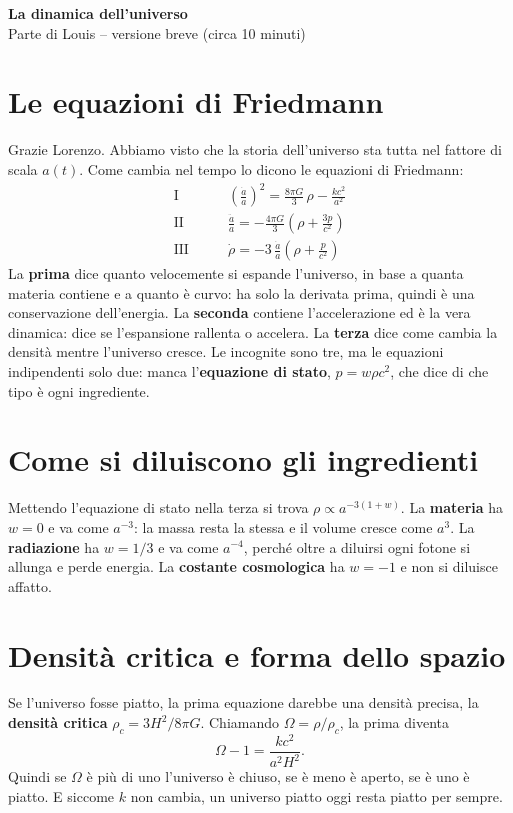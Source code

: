 \documentclass[12pt,a4paper]{article}
\begin{document}
\begin{center}
{\Large\bfseries La dinamica dell'universo}\\[3pt]
{\large Parte di Louis -- versione breve (circa 10 minuti)}
\end{center}

\section{Le equazioni di Friedmann}
Grazie Lorenzo. Abbiamo visto che la storia dell'universo sta tutta nel fattore di scala $a(t)$. Come cambia nel tempo lo dicono le equazioni di Friedmann:
\begin{align*}
\text{I} \qquad & \left(\frac{\dot a}{a}\right)^2 = \frac{8\pi G}{3}\,\rho - \frac{k c^2}{a^2} \\[2pt]
\text{II} \qquad & \frac{\ddot a}{a} = -\frac{4\pi G}{3}\left(\rho + \frac{3p}{c^2}\right) \\[2pt]
\text{III} \qquad & \dot\rho = -3\,\frac{\dot a}{a}\left(\rho + \frac{p}{c^2}\right)
\end{align*}
La \textbf{prima} dice quanto velocemente si espande l'universo, in base a quanta materia contiene e a quanto è curvo: ha solo la derivata prima, quindi è una conservazione dell'energia. La \textbf{seconda} contiene l'accelerazione ed è la vera dinamica: dice se l'espansione rallenta o accelera. La \textbf{terza} dice come cambia la densità mentre l'universo cresce. Le incognite sono tre, ma le equazioni indipendenti solo due: manca l'\textbf{equazione di stato}, $p = w\rho c^2$, che dice di che tipo è ogni ingrediente.

\section{Come si diluiscono gli ingredienti}
Mettendo l'equazione di stato nella terza si trova $\rho \propto a^{-3(1+w)}$. La \textbf{materia} ha $w = 0$ e va come $a^{-3}$: la massa resta la stessa e il volume cresce come $a^3$. La \textbf{radiazione} ha $w = 1/3$ e va come $a^{-4}$, perché oltre a diluirsi ogni fotone si allunga e perde energia. La \textbf{costante cosmologica} ha $w = -1$ e non si diluisce affatto.

\section{Densità critica e forma dello spazio}
Se l'universo fosse piatto, la prima equazione darebbe una densità precisa, la \textbf{densità critica} $\rho_c = 3H^2/8\pi G$. Chiamando $\Omega = \rho/\rho_c$, la prima diventa
\[ \Omega - 1 = \frac{k c^2}{a^2 H^2} . \]
Quindi se $\Omega$ è più di uno l'universo è chiuso, se è meno è aperto, se è uno è piatto. E siccome $k$ non cambia, un universo piatto oggi resta piatto per sempre.
\end{document}
